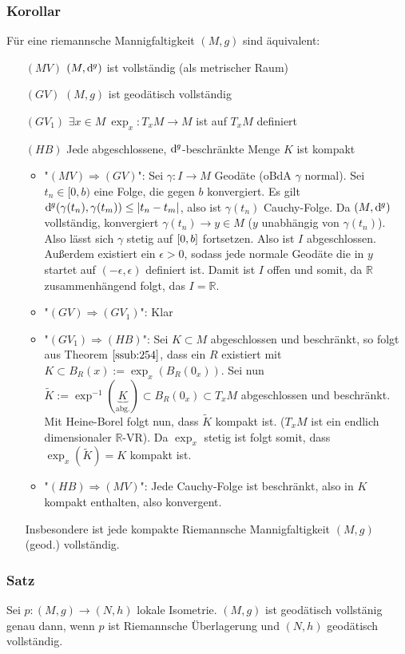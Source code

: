\subsubsection{Korollar}
\label{ssub:255}
Für eine riemannsche Mannigfaltigkeit $(M,g)$ sind äquivalent:
\begin{enumerate}
\item[$(MV)$] $(M,\mathrm{d}\mkern-1.0mu^g)$ ist vollständig (als metrischer Raum)
\item[$(GV)$] $(M,g)$ ist geodätisch vollständig
\item[$(GV_1)$] $\exists x\in M\ \exp_x:T_x M \to M$ ist auf $T_x M$ definiert
\item[$(HB)$] Jede abgeschlossene, $\mathrm{d}\mkern-1.0mu^g$-beschränkte Menge $K$ ist kompakt
\begin{itemize}
\item "$(MV) \Rightarrow (GV)$": Sei $\gamma:I\to M$ Geodäte (oBdA $\gamma$ normal). Sei $t_n\in [0,b)$ eine Folge, die gegen $b$ konvergiert. Es gilt $\mathrm{d}\mkern-1.0mu^g(\gamma(t_n),\gamma(t_m)) \leq \lvert t_n - t_m\rvert$, also ist $\gamma(t_n)$ Cauchy-Folge. Da $(M,\mathrm{d}\mkern-1.0mu^g)$ vollständig, konvergiert $\gamma(t_n) \to y\in M$ ($y$ unabhängig von $\gamma(t_n)$). Also lässt sich $\gamma$ stetig auf $[0,b]$ fortsetzen. Also ist $I$ abgeschlossen. Außerdem existiert ein $\epsilon > 0$, sodass jede normale Geodäte die in $y$ startet auf $(-\epsilon,\epsilon)$ definiert ist. Damit ist $I$ offen und somit, da $\mathds{R}$ zusammenhängend folgt, das $I = \mathds{R}$.
\item "$(GV) \Rightarrow (GV_1)$": Klar
\item "$(GV_1) \Rightarrow (HB)$": Sei $K\subset M$ abgeschlossen und beschränkt, so folgt aus Theorem $\ref{ssub:254}$, dass ein $R$ existiert mit $K\subset B_R(x) := \exp_x(B_R(0_x))$. Sei nun $\tilde{K} := \exp^{-1}(\underbrace{K}_{\text{abg.}}) \subset B_R (0_x) \subset T_x M$ abgeschlossen und beschränkt. Mit Heine-Borel folgt nun, dass $\tilde{K}$ kompakt ist. ($T_x M$ ist ein endlich dimensionaler $\mathds{R}$-VR). Da $\exp_x$ stetig ist folgt somit, dass $\exp_x(\tilde{K}) = K$ kompakt ist.
\item "$(HB) \Rightarrow (MV)$": Jede Cauchy-Folge ist beschränkt, also in $K$ kompakt enthalten, also konvergent.
\end{itemize}
Insbesondere ist jede kompakte Riemannsche Mannigfaltigkeit $(M,g)$ (geod.) vollständig.
\end{enumerate}

\subsubsection{Satz}
\label{ssub:256}
Sei $p:(M,g)\to (N,h)$ lokale Isometrie. $(M,g)$ ist geodätisch vollstänig genau dann, wenn $p$ ist Riemannsche Überlagerung und $(N,h)$ geodätisch vollständig.


